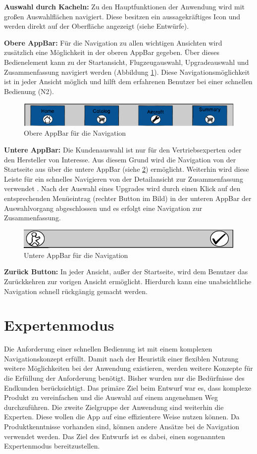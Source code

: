 \textbf{Auswahl durch Kacheln:} Zu den Hauptfunktionen der Anwendung wird mit großen Auswahlflächen navigiert. Diese besitzen ein aussagekräftiges Icon und werden direkt auf der Oberfläche angezeigt (siehe Entwürfe).  

\textbf{Obere AppBar:} Für die Navigation zu allen wichtigen Ansichten wird zusätzlich eine Möglichkeit in der oberen AppBar gegeben. Über dieses Bedienelement kann zu der Startansicht, Flugzeugauswahl, Upgradeauswahl und Zusammenfassung navigiert werden (Abbildung \ref{upperApp}). Diese Navigationsmöglichkeit ist in jeder Ansicht möglich und hilft dem erfahrenen Benutzer bei einer schnellen Bedienung (N2). \par
\begin{figure}[H]
\centering
\includegraphics[width=\hsize]{images/UpperAppBar}
\caption{Obere AppBar für die Navigation}
\label{upperApp}
\end{figure}
\textbf{Untere AppBar:} Die Kundenauswahl ist nur für den Vertriebsexperten oder den Hersteller von Interesse. Aus diesem Grund wird die Navigation von der Startseite aus über die untere AppBar (siehe \ref{lowerApp}) ermöglicht.  Weiterhin wird diese Leiste für ein schnelles Navigieren von der Detailansicht zur Zusammenfassung verwendet . Nach der Auswahl eines Upgrades wird durch einen Klick auf den entsprechenden Menüeintrag (rechter Button im Bild) in der unteren AppBar  der Auswahlvorgang abgeschlossen und es erfolgt eine Navigation zur Zusammenfassung.
\begin{figure}[H]
\centering
\includegraphics[width=\hsize]{images/LowerAppBar}
\caption{Untere AppBar für die Navigation}
\label{lowerApp}
\end{figure}
\textbf{Zurück Button:} In jeder Ansicht, außer der Startseite, wird dem Benutzer das Zurückkehren zur vorigen Ansicht ermöglicht. Hierdurch kann eine unabsichtliche Navigation schnell rückgängig gemacht werden.

\section{Expertenmodus}
Die Anforderung einer schnellen Bedienung ist mit einem komplexen Navigationskonzept erfüllt. Damit nach der Heuristik einer flexiblen Nutzung weitere Möglichkeiten bei der Anwendung existieren, werden weitere Konzepte für die Erfüllung der Anforderung benötigt. Bisher wurden nur die Bedürfnisse des Endkunden berücksichtigt. Das primäre Ziel beim Entwurf war es, dass komplexe Produkt zu vereinfachen und die Auswahl auf einem angenehmen Weg durchzuführen. Die zweite Zielgruppe der Anwendung sind weiterhin die Experten. Diese wollen die App auf eine effizientere Weise nutzen können. Da Produktkenntnisse vorhanden sind, können andere Ansätze bei de Navigation verwendet werden. Das Ziel des Entwurfs ist es dabei, einen sogenannten Expertenmodus bereitzustellen.


